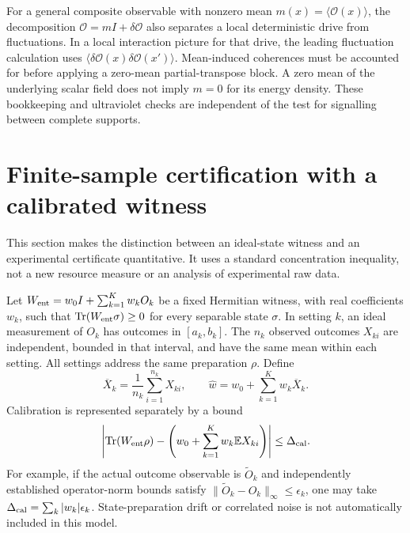 \documentclass[pdflatex,sn-mathphys-num]{sn-jnl}
\newcommand{\Tr}{\operatorname{Tr}}
\begin{document}
For a general composite observable with nonzero mean $m(x)=\langle\mathcal O(x)\rangle$, the decomposition
$\mathcal O=mI+\delta\mathcal O$ also separates a local deterministic drive from fluctuations. In a local interaction picture for that drive, the leading fluctuation calculation uses $\langle\delta\mathcal O(x)\delta\mathcal O(x')\rangle$. Mean-induced coherences must be accounted for before applying a zero-mean partial-transpose block. A zero mean of the underlying scalar field does not imply $m=0$ for its energy density. These bookkeeping and ultraviolet checks are independent of the test for signalling between complete supports.




\section{Finite-sample certification with a calibrated witness}
\label{app:finite-sample}

This section makes the distinction between an ideal-state witness and an experimental certificate quantitative. It uses a standard concentration inequality, not a new resource measure or an analysis of experimental raw data.

Let $W_{\rm ent}=w_0I+\sum_{k=1}^K w_kO_k$ be a fixed Hermitian witness, with real coefficients $w_k$, such that $\Tr(W_{\rm ent}\sigma)\geq0$ for every separable state $\sigma$. In setting $k$, an ideal measurement of $O_k$ has outcomes in $[a_k,b_k]$. The $n_k$ observed outcomes $X_{ki}$ are independent, bounded in that interval, and have the same mean within each setting. All settings address the same preparation $\rho$. Define
\begin{equation}
\overline X_k=\frac{1}{n_k}\sum_{i=1}^{n_k}X_{ki},\qquad
\widehat w=w_0+\sum_{k=1}^K w_k\overline X_k.
\label{eq:supp-witness-estimate}
\end{equation}
Calibration is represented separately by a bound
\begin{equation}
\left|\Tr(W_{\rm ent}\rho)-
\left(w_0+\sum_{k=1}^Kw_k\mathbb E X_{ki}\right)\right|
\leq\Delta_{\rm cal}.
\label{eq:supp-calibration-bound}
\end{equation}
For example, if the actual outcome observable is $\widetilde O_k$ and independently established operator-norm bounds satisfy $\|\widetilde O_k-O_k\|_\infty\leq\epsilon_k$, one may take $\Delta_{\rm cal}=\sum_k|w_k|\epsilon_k$. State-preparation drift or correlated noise is not automatically included in this model.
\end{document}
